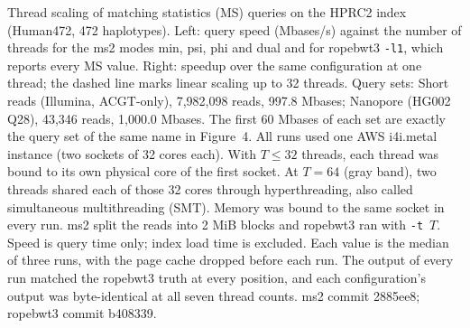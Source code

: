 \caption{Thread scaling of matching statistics (MS) queries on the HPRC2 index (Human472, 472
haplotypes). Left: query speed (Mbases/s) against the number of threads for the ms2 modes min, psi,
phi and dual and for ropebwt3 \texttt{-l1}, which reports every MS value. Right: speedup over the
same configuration at one thread; the dashed line marks linear scaling up to 32 threads. Query
sets: Short reads (Illumina, ACGT-only), 7,982,098 reads, 997.8 Mbases; Nanopore (HG002 Q28),
43,346 reads, 1,000.0 Mbases. The first 60 Mbases of each set are exactly the
query set of the same name in Figure~4. All runs used one AWS i4i.metal instance (two sockets of
32 cores each). With $T \le 32$ threads, each thread was bound to its own physical core of the
first socket. At $T = 64$ (gray band), two threads shared each of those 32 cores through
hyperthreading, also called simultaneous multithreading (SMT). Memory was bound to the same
socket in every run. ms2 split the reads into 2 MiB blocks and ropebwt3 ran with
\texttt{-t}~$T$. Speed is query time only; index load time is excluded. Each value is the median
of three runs, with the page cache dropped before each run. The output of every run matched the
ropebwt3 truth at every position, and each configuration's output was byte-identical at all
seven thread counts. ms2 commit 2885ee8; ropebwt3 commit b408339.}
\label{fig:threads}

